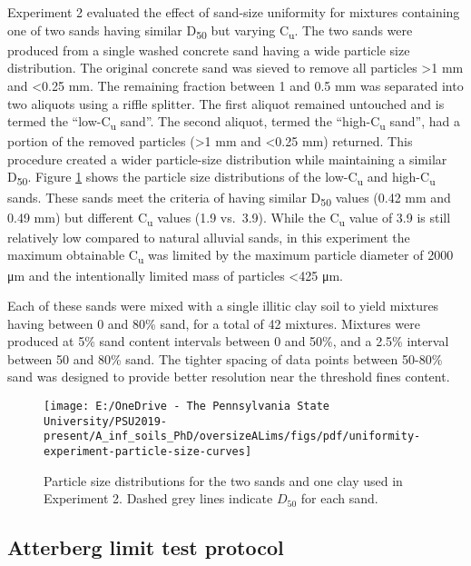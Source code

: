 \documentclass[
  letterpaper,
]{article}
\begin{document}
Experiment 2 evaluated the effect of sand-size uniformity for mixtures containing one of two sands having similar D\textsubscript{50} but varying C\textsubscript{u}.
The two sands were produced from a single washed concrete sand having a wide particle size distribution.
The original concrete sand was sieved to remove all particles \textgreater1 mm and \textless0.25 mm.
The remaining fraction between 1 and 0.5 mm was separated into two aliquots using a riffle splitter.
The first aliquot remained untouched and is termed the ``low-C\textsubscript{u} sand''.
The second aliquot, termed the ``high-C\textsubscript{u} sand'', had a portion of the removed particles (\textgreater1 mm and \textless0.25 mm) returned.
This procedure created a wider particle-size distribution while maintaining a similar D\textsubscript{50}.
Figure \ref{fig:uniformity-experiment-particle-size-curves} shows the particle size distributions of the low-C\textsubscript{u} and high-C\textsubscript{u} sands.
These sands meet the criteria of having similar D\textsubscript{50} values (0.42 mm and 0.49 mm) but different C\textsubscript{u} values (1.9 vs.~3.9).
While the C\textsubscript{u} value of 3.9 is still relatively low compared to natural alluvial sands, in this experiment the maximum obtainable C\textsubscript{u} was limited by the maximum particle diameter of 2000 μm and the intentionally limited mass of particles \textless425 μm.

Each of these sands were mixed with a single illitic clay soil to yield mixtures having between 0 and 80\% sand, for a total of 42 mixtures.
Mixtures were produced at 5\% sand content intervals between 0 and 50\%, and a 2.5\% interval between 50 and 80\% sand.
The tighter spacing of data points between 50-80\% sand was designed to provide better resolution near the threshold fines content.

\begin{figure}

{\centering \texttt{[image: E:/OneDrive - The Pennsylvania State University/PSU2019-present/A\_inf\_soils\_PhD/oversizeALims/figs/pdf/uniformity-experiment-particle-size-curves]} 

}

\caption{Particle size distributions for the two sands and one clay used in Experiment 2. Dashed grey lines indicate $D_{50}$ for each sand.}\label{fig:uniformity-experiment-particle-size-curves}
\end{figure}

\hypertarget{atterberg-limit-test-protocol}{%
\subsection{Atterberg limit test protocol}\label{atterberg-limit-test-protocol}}
\end{document}
